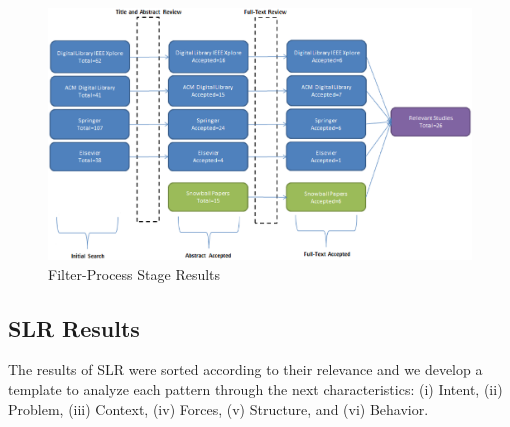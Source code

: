 \begin{figure}[ht!]
	\centering
	\includegraphics[width=17cm]{fig/filter-process.eps}
	\caption{Filter-Process Stage Results}
	\label{fig:filter-process}
\end{figure}


\subsection{SLR Results}
\label{sec:SLRResults}
The results of SLR were sorted according to their relevance and we develop a template to analyze each pattern through the next characteristics: (i) Intent, (ii) Problem, (iii) Context, (iv) Forces, (v) Structure, and (vi) Behavior.


